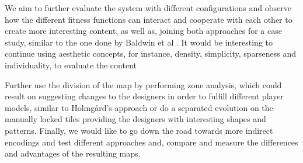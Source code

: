 
We aim to further evaluate the system with different configurations and observe how the different fitness functions can interact and cooperate with each other to create more interesting content, as well as, joining both approaches for a case study, similar to the one done by Baldwin et al . It would be interesting to continue using aesthetic concepts, for instance, density, simplicity, sparseness and individuality, to evaluate the content 

Further use the division of the map by performing zone analysis, which could result on suggesting changes to the designers in order to fulfill different player models, similar to Holmg\r{a}rd's approach  or do a separated evolution on the manually locked tiles providing the designers with interesting shapes and patterns. Finally, we would like to go down the road towards more indirect encodings and test different approaches and, compare and measure the differences and advantages of the resulting maps.